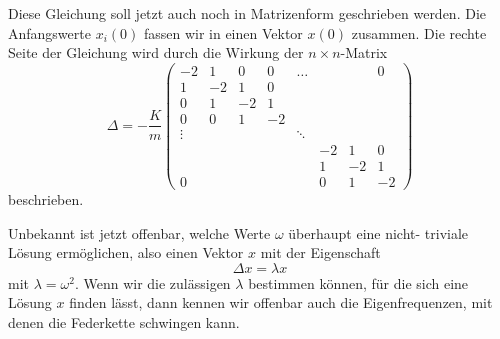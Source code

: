 Diese Gleichung soll jetzt auch noch in Matrizenform geschrieben werden.
Die Anfangswerte $x_i(0)$ fassen wir in einen Vektor $x(0)$ zusammen.
Die rechte Seite der Gleichung wird durch die Wirkung der $n\times n$-Matrix
\[
\Delta=
-\frac{K}{m}
\begin{pmatrix}
-2&1&0&0&\dots&&&0\\
1&-2&1&0&&&&\\
0&1&-2&1&&&&\\
0&0&1&-2&&&&\\
\vdots&&&&\ddots&&\\
 &&&&&-2&1&0\\
 &&&&&1&-2&1\\
0&&&&&0&1&-2
\end{pmatrix}
\]
beschrieben.

Unbekannt ist jetzt offenbar, welche Werte $\omega$ überhaupt eine nicht-%
triviale Lösung ermöglichen, also einen Vektor $x$ mit der Eigenschaft
\[
\Delta x=\lambda x
\]
mit $\lambda=\omega^2$.
Wenn wir die zulässigen $\lambda$ bestimmen können,
für die sich eine Lösung $x$ finden lässt, dann kennen wir offenbar auch
die Eigenfrequenzen, mit denen die Federkette schwingen kann.

